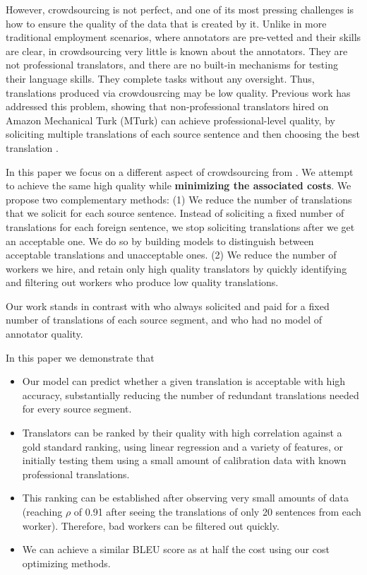 \documentclass[11pt,letterpaper]{article}
\begin{document}
However, crowdsourcing is not perfect, and one of its most pressing challenges is how to ensure the quality of the data that is created by it.  Unlike in more traditional employment scenarios, where annotators are pre-vetted and their skills are clear, in crowdsourcing very little is known about the annotators.  They are not professional translators, and there are no built-in mechanisms for testing their language skills.  They complete tasks without any oversight. Thus, translations produced via crowdousrcing may be low quality.
Previous work has addressed this problem, showing that non-professional translators hired on Amazon Mechanical Turk (MTurk) can achieve professional-level quality, by soliciting multiple translations of each source sentence and then choosing the best translation \cite{zaidan-callisonburch:2011:ACL-HLT2011a}.

In this paper we focus on a different aspect of crowdsourcing from .  We attempt to achieve the same high quality while {\bf minimizing the associated costs}.  
We propose two complementary methods:
(1) We reduce the number of translations that we solicit for each source sentence. Instead of soliciting a fixed number of translations for each foreign sentence, we stop soliciting translations after we get an acceptable one.  We do so by building models to distinguish between acceptable translations and unacceptable ones. (2) We reduce the number of workers we hire, and retain only high quality translators by quickly identifying and filtering out workers who produce low quality translations. 
  

Our work stands in contrast with   who always solicited and paid for a fixed number of translations of each source segment, and who had no model of annotator quality. 
 
 In this paper we demonstrate that
 \begin{itemize}
 \item Our model can predict whether a given translation is acceptable with high accuracy, substantially reducing the number of redundant translations needed for every source segment.
 \item Translators can be ranked by their quality with high correlation against a gold standard ranking, using linear regression and a variety of features, or initially testing them using a small amount of calibration data with known professional translations.
 \item This ranking can be established after observing very small amounts of data (reaching $\rho$ of 0.91 after seeing the translations of only 20 sentences from each worker). Therefore, bad workers can be filtered out quickly.
 
 \item We can achieve a similar BLEU score as  at half the cost using our cost optimizing methods.
 \end{itemize} 
 
\end{document}
